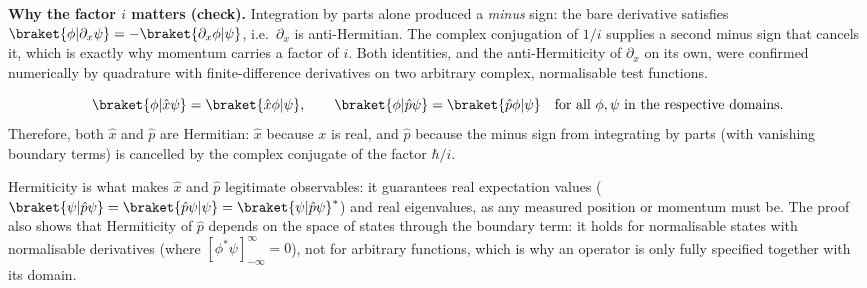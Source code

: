 \begin{solutionbox}
\textbf{Why the factor $i$ matters (check).} Integration by parts alone produced a \emph{minus} sign: the bare derivative satisfies $\braket{\phi|\partial_x\psi}=-\braket{\partial_x\phi|\psi}$, i.e.\ $\partial_x$ is anti-Hermitian. The complex conjugation of $1/i$ supplies a second minus sign that cancels it, which is exactly why momentum carries a factor of $i$. Both identities, and the anti-Hermiticity of $\partial_x$ on its own, were confirmed numerically by quadrature with finite-difference derivatives on two arbitrary complex, normalisable test functions.
\end{solutionbox}

\begin{answerbox}
\[
\braket{\phi|\hat x\psi}=\braket{\hat x\phi|\psi},\qquad
\braket{\phi|\hat p\psi}=\braket{\hat p\phi|\psi}\quad\text{for all }\phi,\psi\text{ in the respective domains.}
\]
Therefore, both $\hat x$ and $\hat p$ are Hermitian: $\hat x$ because $x$ is real, and $\hat p$ because the minus sign from integrating by parts (with vanishing boundary terms) is cancelled by the complex conjugate of the factor $\hbar/i$.
\end{answerbox}

\begin{insightbox}
Hermiticity is what makes $\hat x$ and $\hat p$ legitimate observables: it guarantees real expectation values ($\braket{\psi|\hat p\psi}=\braket{\hat p\psi|\psi}=\braket{\psi|\hat p\psi}^*$) and real eigenvalues, as any measured position or momentum must be. The proof also shows that Hermiticity of $\hat p$ depends on the space of states through the boundary term: it holds for normalisable states with normalisable derivatives (where $[\phi^*\psi]_{-\infty}^{\infty}=0$), not for arbitrary functions, which is why an operator is only fully specified together with its domain.
\end{insightbox}
